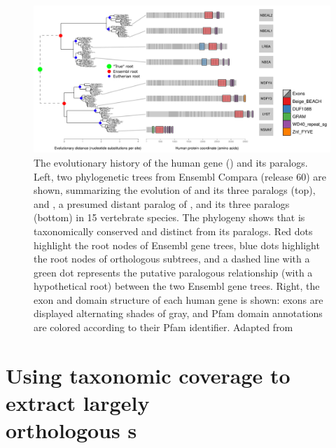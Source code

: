 \begin{figure}
\centering
\includegraphics[scale=0.35]{Figs/nbeal2_full.pdf}
\caption{The evolutionary history of the human  gene () and its paralogs. Left, two phylogenetic
  trees from Ensembl Compara (release 60) are shown, summarizing the
  evolution of  and its three paralogs (top), and
  , a presumed distant paralog of , and its
  three paralogs (bottom) in 15 vertebrate species. The phylogeny
  shows that  is taxonomically conserved and distinct
  from its paralogs. Red dots highlight the root nodes of Ensembl gene
  trees, blue dots highlight the root nodes of \euth orthologous
  subtrees, and a dashed line with a green dot represents the putative
  paralogous relationship (with a hypothetical root) between the two
  Ensembl gene trees. Right, the exon and domain structure of each
  human gene is shown: exons are displayed alternating shades of gray,
  and Pfam domain annotations are colored according to their Pfam
  identifier. Adapted from \citep{Albers2011}}
\label{nbeal2}
\end{figure}



\section[Using taxonomic coverage to extract largely orthologous \mammln \subtr{}s]{Using taxonomic coverage to extract largely \\ \mbox{orthologous} \mammln \subtr{}s}

